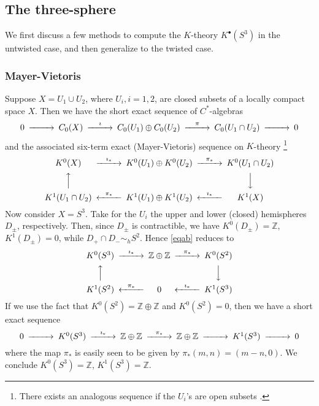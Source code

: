 \documentclass[a4paper,reqno]{amsart}
\theoremstyle{plain}
\theoremstyle{definition}
\theoremstyle{remark}
\numberwithin{equation}{section}
\numberwithin{figure}{section}
\newcommand{\ZZ}{{\mathbb Z}}
\newcommand{\<}{\langle}
\renewcommand{\>}{\rangle}
\begin{document}
\subsection{The three-sphere}

We first discuss a few methods to compute the $K$-theory $K^\bullet(S^3)$
in the untwisted case, and then generalize to the twisted case.

\subsubsection{Mayer-Vietoris}

Suppose $X=U_1\cup U_2$, where $U_i, i=1,2$, are closed subsets
of a locally compact space $X$. Then we have the short exact
sequence of $C^*$-algebras
\begin{equation}
\begin{CD}
0 @>>> C_0(X) @>\imath>> C_0(U_1) \oplus C_0(U_2) @>\pi>>
C_0(U_1\cap U_2) @>>> 0
\end{CD}
\end{equation}
and the associated six-term exact
(Mayer-Vietoris) sequence on $K$-theory \cite[Th. 4.18]{Kar} %
\footnote{There exists an analogous sequence if the $U_i$'s are
open subsets \cite[Th. 4.19]{Kar}.}
\begin{equation} \label{eqab}
\begin{CD}
K^0(X) @>\imath_*>> K^0(U_1)\oplus K^0(U_2) @>\pi_*>>
        K^0(U_1\cap U_2) \\
@AAA      && @VVV \\
K^1(U_1\cap U_2) @<\pi_*<< K^1(U_1)\oplus K^1(U_2) @<\imath_*<<
         K^1(X)
\end{CD}
\end{equation}
Now consider $X=S^3$.  Take for the $U_i$ the upper and lower
(closed) hemispheres $D_\pm$, respectively.  Then, since $D_\pm$
is contractible, we have $K^0(D_\pm)=\ZZ$, $K^1(D_\pm)=0$, while
$D_+\cap D_- \sim_h S^2$.  Hence \eqref{eqab} reduces to
\begin{equation}
\begin{CD}
K^0(S^3) @>\imath_*>> \ZZ \oplus \ZZ @>\pi_*>> K^0(S^2) \\
@AAA      && @VVV \\
K^1(S^2) @<\pi_*<< 0 @<\imath_*<<    K^1(S^3)
\end{CD}
\end{equation}
If we use the fact that $K^0(S^2)=\ZZ \oplus \ZZ$ and $K^0(S^2)=0$,
then we have a short exact sequence
\begin{equation}
\begin{CD}
0 @>>> K^0(S^3) @>\imath_*>> \ZZ \oplus \ZZ @>\pi_*>> \ZZ \oplus \ZZ
@>>> K^1(S^3) @>>> 0
\end{CD}
\end{equation}
where the map $\pi_*$ is easily seen to be given by $\pi_*(m,n)=(m-n,0)$.
We conclude $K^0(S^3)=\ZZ$, $K^1(S^3)=\ZZ$.
\end{document}
